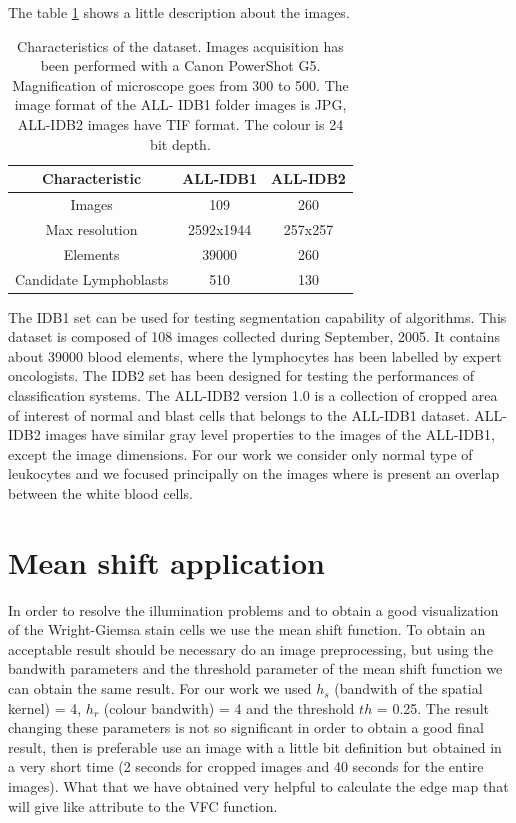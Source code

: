 \bigskip

The table \ref{tableidb} shows a little description about the images.
\begin{table}
\centering
\begin{tabular}{|c|c|c|}
\hline 
Characteristic & ALL-IDB1 & ALL-IDB2 \\ 
\hline 
Images & 109 & 260 \\ 
\hline 
Max resolution & 2592x1944 & 257x257 \\ 
\hline 
Elements & 39000 & 260 \\ 
\hline 
Candidate Lymphoblasts & 510 & 130 \\ 
\hline 
\end{tabular} 
\caption{Characteristics of the dataset. Images acquisition has been performed with a Canon PowerShot G5. Magnification of microscope goes from 300 to 500. The image format of the ALL- IDB1 folder images is JPG, ALL-IDB2 images have TIF format. The colour is 24 bit depth.}
\label{tableidb}
\end{table}
The IDB1 set can be used for testing segmentation capability of algorithms. This dataset is composed of 108 images collected during September, 2005. It contains about 39000 blood elements, where the lymphocytes has been labelled by expert oncologists.\cite{website:IDB}
The IDB2 set has been designed for testing the performances of classification systems. The ALL-IDB2 version 1.0 is a collection of cropped area of interest of normal and blast cells that belongs to the ALL-IDB1 dataset. ALL-IDB2 images have similar gray level properties to the images of the ALL-IDB1, except the image dimensions.\cite{website:IDB}
For our work we consider only normal type of leukocytes and we focused principally on the images where is present an overlap between the white blood cells.

\section{Mean shift application}
In order to resolve the illumination problems and to obtain a good visualization of the Wright-Giemsa stain cells we use the mean shift function. To obtain an acceptable result should be necessary do an image preprocessing, but using the bandwith parameters and the threshold parameter of the mean shift function we can obtain the same result. For our work we used $h_{s}$ (bandwith of the spatial kernel) = 4, $h_{r}$ (colour bandwith) = 4 and the threshold $th$ = 0.25. The result changing these parameters is not so significant in order to obtain a good final result, then is preferable use an image with a little bit definition but obtained in a very short time (2 seconds for cropped images and 40 seconds for the entire images). What that we have obtained very helpful to calculate the edge map that will give like attribute to the VFC function.

